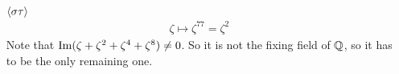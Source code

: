\begin{ex}[]
\begin{itemize}
  \item[$\langle\sigma \tau\rangle$]
    \begin{align*}
      \zeta \mapsto \zeta^{77} = \zeta^{2}
    \end{align*}
    Note that $\operatorname{Im}(\zeta + \zeta^{2} + \zeta^{4} + \zeta^{8}) \neq 0$.
    So it is not the fixing field of $\mathbb{Q}$, so it has to be the only remaining one.
\end{itemize}

  \begin{center}
  \end{center}
\end{ex}
